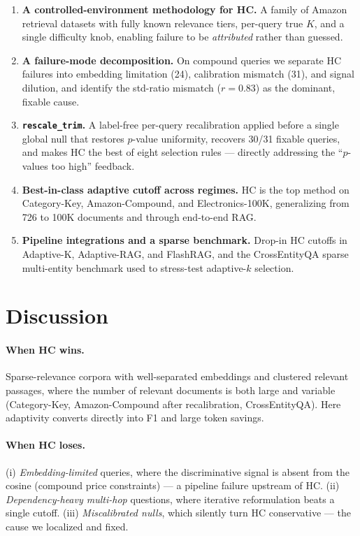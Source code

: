 \documentclass[letterpaper]{article}
\newcommand{\Nirr}{24}
\newcommand{\Nfix}{31}
\newcommand{\StdR}{0.83}
\begin{document}
\begin{enumerate}
\item \textbf{A controlled-environment methodology for HC.} A family of
Amazon retrieval datasets with fully known relevance tiers, per-query
true $K$, and a single difficulty knob, enabling failure to be
\emph{attributed} rather than guessed.
\item \textbf{A failure-mode decomposition.} On compound queries we
separate HC failures into embedding limitation (\Nirr{}), calibration
mismatch (\Nfix), and signal dilution, and identify the std-ratio
mismatch ($r\!=\!\StdR$) as the dominant, fixable cause.
\item \textbf{\texttt{rescale\_trim}.} A label-free per-query
recalibration applied before a single global null that restores
$p$-value uniformity, recovers 30/\Nfix{} fixable queries, and makes HC
the best of eight selection rules --- directly addressing the
``$p$-values too high'' feedback.
\item \textbf{Best-in-class adaptive cutoff across regimes.} HC is the
top method on Category-Key, Amazon-Compound, and Electronics-100K,
generalizing from 726 to 100K documents and through end-to-end RAG.
\item \textbf{Pipeline integrations and a sparse benchmark.} Drop-in HC
cutoffs in Adaptive-K, Adaptive-RAG, and FlashRAG, and the
CrossEntityQA sparse multi-entity benchmark used to stress-test
adaptive-$k$ selection.
\end{enumerate}

\section{Discussion}

\paragraph{When HC wins.} Sparse-relevance corpora with well-separated
embeddings and clustered relevant passages, where the number of
relevant documents is both large and variable (Category-Key,
Amazon-Compound after recalibration, CrossEntityQA). Here adaptivity
converts directly into F1 and large token savings.

\paragraph{When HC loses.} (i) \emph{Embedding-limited} queries, where
the discriminative signal is absent from the cosine (compound price
constraints) --- a pipeline failure upstream of HC. (ii)
\emph{Dependency-heavy multi-hop} questions, where iterative
reformulation beats a single cutoff. (iii) \emph{Miscalibrated nulls},
which silently turn HC conservative --- the cause we localized and
fixed.
\end{document}
